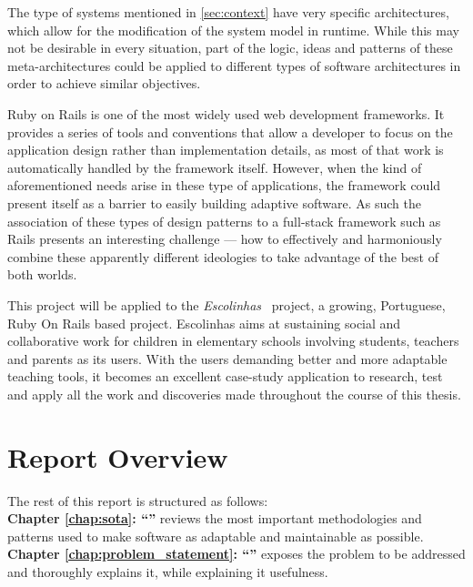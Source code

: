 The type of systems mentioned in \ref{sec:context} have very specific architectures, which allow for the modification of the system model in runtime. While this may not be desirable in every situation, part of the logic, ideas and patterns of these meta-architectures could be applied to different types of software architectures in order to achieve similar objectives.

Ruby on Rails is one of the most widely used web development frameworks. It provides a series of tools and conventions that allow a developer to focus on the application design rather than implementation details, as most of that work is automatically handled by the framework itself. However, when the kind of aforementioned needs arise in these type of applications, the framework could present itself as a barrier to easily building adaptive software. As such the association of these types of design patterns to a full-stack framework such as Rails presents an interesting challenge --- how to effectively and harmoniously combine these apparently different ideologies to take advantage of the best of both worlds.

This project will be applied to the \textit{Escolinhas}~\cite{escolinhas} project, a growing, Portuguese, Ruby On Rails based project. Escolinhas aims at sustaining social and collaborative work for children in elementary schools involving students, teachers and parents as its users. With the users demanding better and more adaptable teaching tools, it becomes an excellent case-study application to research, test and apply all the work and discoveries made throughout the course of this thesis.

\section{Report Overview}\label{sec:structure}

The rest of this report is structured as follows:\\

\textbf{Chapter \ref{chap:sota}: ``'' } reviews the most important methodologies and patterns used to make software as adaptable and maintainable as possible.\\

\textbf{Chapter \ref{chap:problem_statement}: ``'' } exposes the problem to be addressed and thoroughly explains it, while explaining it usefulness.\\

